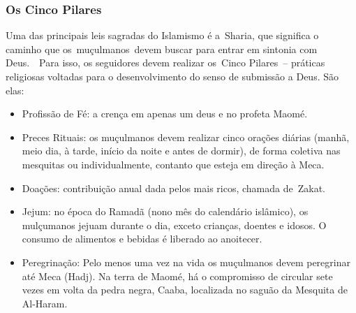 \documentclass[12pt]{article}
\begin{document}
\subsubsection{Os Cinco Pilares}
Uma das principais leis sagradas do Islamismo é a Sharia, que significa o caminho que os muçulmanos devem buscar para entrar em sintonia com Deus.  Para isso, os seguidores devem realizar os Cinco Pilares – práticas religiosas voltadas para o desenvolvimento do senso de submissão a Deus. São elas: 
\begin{itemize}
    \item Profissão de Fé: a crença em apenas um deus e no profeta Maomé. 
    \item Preces Rituais: os muçulmanos devem realizar cinco orações diárias (manhã, meio dia, à tarde, início da noite e antes de dormir), de forma coletiva nas mesquitas ou individualmente, contanto que esteja em direção à Meca. 
    \item Doações: contribuição anual dada pelos mais ricos, chamada de Zakat. 
    \item Jejum: no época do Ramadã (nono mês do calendário islâmico), os mulçumanos jejuam durante o dia, exceto crianças, doentes e idosos. O consumo de alimentos e bebidas é liberado ao anoitecer. 
    \item Peregrinação: Pelo menos uma vez na vida os muçulmanos devem peregrinar até Meca (Hadj). Na terra de Maomé, há o compromisso de circular sete vezes em volta da pedra negra, Caaba, localizada no saguão da Mesquita de Al-Haram. 
\end{itemize}
\end{document}
